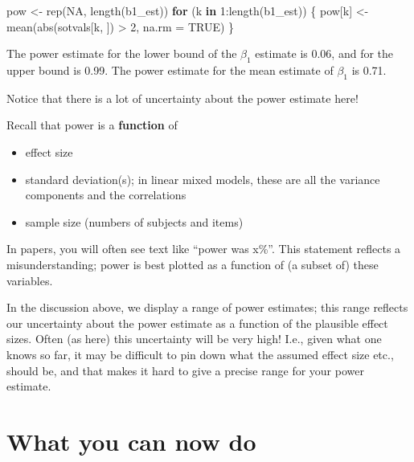 \documentclass[
  12pt,
]{krantz}
\newenvironment{Shaded}{\begin{snugshade}}{\end{snugshade}}
\newcommand{\AttributeTok}[1]{\textcolor[rgb]{0.77,0.63,0.00}{#1}}
\newcommand{\ConstantTok}[1]{\textcolor[rgb]{0.00,0.00,0.00}{#1}}
\newcommand{\ControlFlowTok}[1]{\textcolor[rgb]{0.13,0.29,0.53}{\textbf{#1}}}
\newcommand{\DecValTok}[1]{\textcolor[rgb]{0.00,0.00,0.81}{#1}}
\newcommand{\FunctionTok}[1]{\textcolor[rgb]{0.00,0.00,0.00}{#1}}
\newcommand{\NormalTok}[1]{#1}
\newcommand{\OtherTok}[1]{\textcolor[rgb]{0.56,0.35,0.01}{#1}}
\newcommand{\SpecialCharTok}[1]{\textcolor[rgb]{0.00,0.00,0.00}{#1}}
\providecommand{\tightlist}{%
  \setlength{\itemsep}{0pt}\setlength{\parskip}{0pt}}
\theoremstyle{definition}
\theoremstyle{definition}
\theoremstyle{definition}
\theoremstyle{definition}
\theoremstyle{remark}
\begin{document}
\begin{Shaded}
\begin{Highlighting}[]
\NormalTok{pow }\OtherTok{\textless{}{-}} \FunctionTok{rep}\NormalTok{(}\ConstantTok{NA}\NormalTok{, }\FunctionTok{length}\NormalTok{(b1\_est))}
\ControlFlowTok{for}\NormalTok{ (k }\ControlFlowTok{in} \DecValTok{1}\SpecialCharTok{:}\FunctionTok{length}\NormalTok{(b1\_est)) \{}
\NormalTok{  pow[k] }\OtherTok{\textless{}{-}} \FunctionTok{mean}\NormalTok{(}\FunctionTok{abs}\NormalTok{(sotvals[k, ]) }\SpecialCharTok{\textgreater{}} \DecValTok{2}\NormalTok{, }\AttributeTok{na.rm =} \ConstantTok{TRUE}\NormalTok{)}
\NormalTok{\}}
\end{Highlighting}
\end{Shaded}

The power estimate for the lower bound of the \(\beta_1\) estimate is 0.06, and for the upper bound is 0.99. The power estimate for the mean estimate of \(\beta_1\) is 0.71.

Notice that there is a lot of uncertainty about the power estimate here!

Recall that power is a \textbf{function} of

\begin{itemize}
\tightlist
\item
  effect size
\item
  standard deviation(s); in linear mixed models, these are all the variance components and the correlations
\item
  sample size (numbers of subjects and items)
\end{itemize}

In papers, you will often see text like ``power was x\%''. This statement reflects a misunderstanding; power is best plotted as a function of (a subset of) these variables.

In the discussion above, we display a range of power estimates; this range reflects our uncertainty about the power estimate as a function of the plausible effect sizes. Often (as here) this uncertainty will be very high! I.e., given what one knows so far, it may be difficult to pin down what the assumed effect size etc., should be, and that makes it hard to give a precise range for your power estimate.

\hypertarget{what-you-can-now-do}{%
\section{What you can now do}\label{what-you-can-now-do}}
\end{document}
